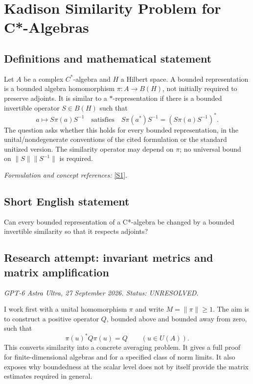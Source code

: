 \documentclass[11pt]{article}
\begin{document}
\section*{\texorpdfstring{Kadison Similarity Problem for C*-Algebras}{Kadison Similarity Problem for C*-Algebras}}\label{30006814}
\subsection{Definitions and mathematical statement}
Let $A$ be a complex $C^*$-algebra and $H$ a Hilbert space. A bounded representation is a bounded algebra homomorphism $\pi:A\to B(H)$, not initially required to preserve adjoints. It is similar to a $*$-representation if there is a bounded invertible operator $S\in B(H)$ such that
\[
 a\longmapsto S\pi(a)S^{-1}
 \quad\text{satisfies}\quad
 S\pi(a^*)S^{-1}=(S\pi(a)S^{-1})^*.
\]
The question asks whether this holds for every bounded representation, in the unital/nondegenerate conventions of the cited formulation or the standard unitized version. The similarity operator may depend on $\pi$; no universal bound on $\|S\|\|S^{-1}\|$ is required.
\par\smallskip\textit{Formulation and concept references:} \href{https://gupea.ub.gu.se/server/api/core/bitstreams/57159657-f889-4758-943d-0b64466e9f64/content}{[S1]}.

\subsection{Short English statement}
Can every bounded representation of a C*-algebra be changed by a bounded invertible similarity so that it respects adjoints?
\subsection{Research attempt: invariant metrics and matrix amplification}
\textit{GPT-6 Astra Ultra, 27 September 2026. Status: UNRESOLVED.}

I work first with a unital homomorphism $\pi$ and write $M=\|\pi\|\ge1$. The aim is to construct a positive operator $Q$, bounded above and bounded away from zero, such that
\[
 \pi(u)^*Q\pi(u)=Q\qquad(u\in U(A)).                         \tag{1}
\]
This converts similarity into a concrete averaging problem. It gives a full proof for finite-dimensional algebras and for a specified class of norm limits. It also exposes why boundedness at the scalar level does not by itself provide the matrix estimates required in general.
\end{document}
